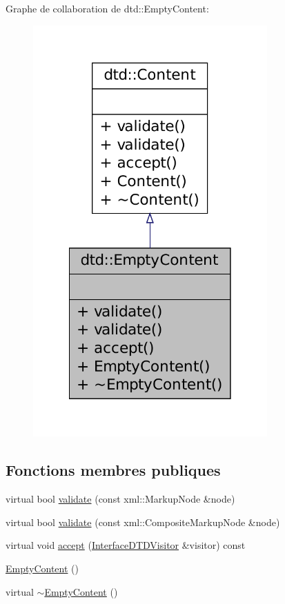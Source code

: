 Graphe de collaboration de dtd::EmptyContent:\nopagebreak
\begin{figure}[H]
\begin{center}
\leavevmode
\includegraphics[width=254pt]{classdtd_1_1_empty_content__coll__graph}
\end{center}
\end{figure}
\subsection*{Fonctions membres publiques}
\begin{DoxyCompactItemize}
\item 
virtual bool \hyperlink{classdtd_1_1_empty_content_a763480d5964b94051f15a7ee5fbb936b}{validate} (const xml::MarkupNode \&node)
\item 
virtual bool \hyperlink{classdtd_1_1_empty_content_a97da0ccd8f6156b168f13759c920c6cc}{validate} (const xml::CompositeMarkupNode \&node)
\item 
virtual void \hyperlink{classdtd_1_1_empty_content_a8440fe4e357b401e8db8d05baf59803e}{accept} (\hyperlink{classdtd_1_1_interface_d_t_d_visitor}{InterfaceDTDVisitor} \&visitor) const 
\item 
\hyperlink{classdtd_1_1_empty_content_a81e2a7171e15447fa33a5b473073ffff}{EmptyContent} ()
\item 
virtual \hyperlink{classdtd_1_1_empty_content_a35b3bed652050e8e7aced4482bfc25d7}{$\sim$EmptyContent} ()
\end{DoxyCompactItemize}


